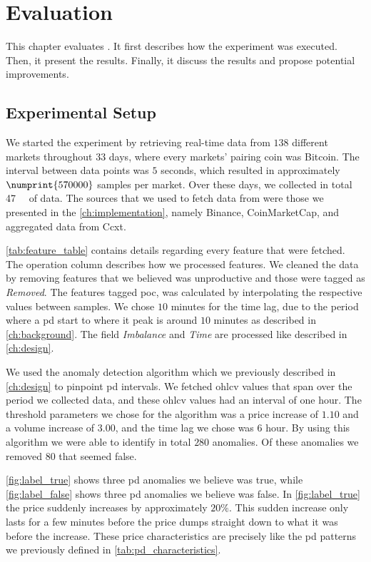 \chapter{Evaluation}\label{ch:evaluation}\glsresetall
This chapter evaluates \project. It first describes how the experiment was executed. Then, it present the results. Finally, it discuss the results and propose potential improvements.

\section{Experimental Setup}\label{sec:experimental_setup}
We started the experiment by retrieving real-time data from $138$ different markets throughout $33$ days, where every markets' pairing coin was Bitcoin. The interval between data points was $5$ seconds, which resulted in approximately $\numprint{570 000}$ samples per market. Over these days, we collected in total \SI{47}{\giga\byte} of data. The sources that we used to fetch data from were those we presented in the \autoref{ch:implementation}, namely Binance, CoinMarketCap, and aggregated data from Ccxt. 

\autoref{tab:feature_table} contains details regarding every feature that were fetched. The operation column describes how we processed features. We cleaned the data by removing features that we believed was unproductive and those were tagged as \emph{Removed}. The features tagged \ac{poc}, was calculated by interpolating the respective values between samples. We chose $10$ minutes for the time lag, due to the period where a \ac{pd} start to where it peak is around $10$ minutes as described in \autoref{ch:background}. The field \emph{Imbalance} and \emph{Time} are processed like described in \autoref{ch:design}.



We used the anomaly detection algorithm which we previously described in \autoref{ch:design} to pinpoint \ac{pd} intervals. We fetched \ac{ohlcv} values that span over the period we collected data, and these \ac{ohlcv} values had an interval of one hour. The threshold parameters we chose for the algorithm was a price increase of $1.10$ and a volume increase of $3.00$, and the time lag we chose was $6$ hour. By using this algorithm we were able to identify in total $280$ anomalies. Of these anomalies we removed $80$ that seemed false.

\autoref{fig:label_true} shows three \ac{pd} anomalies we believe was true, while \autoref{fig:label_false} shows three \ac{pd} anomalies we believe was false. In \autoref{fig:label_true} the price suddenly increases by approximately $20\%$. This sudden increase only lasts for a few minutes before the price dumps straight down to what it was before the increase. These price characteristics are precisely like the \ac{pd} patterns we previously defined in \autoref{tab:pd_characteristics}. 

